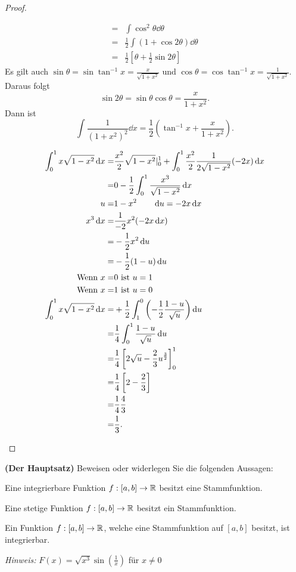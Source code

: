 \begin{proof}
\begin{parts}
\begin{align*}
			=& \int \cos^2\theta\dd{\theta} \\
			=& \frac{1}{2}\int\left( 1+\cos 2\theta \right) \dd{\theta}   \\
			=& \frac{1}{2}\left[ \theta+\frac{1}{2}\sin 2\theta \right] 
		\end{align*}
		Es gilt auch $\sin\theta=\sin\tan^{-1}x=\frac{x}{\sqrt{1+x^2} }$ und $\cos\theta=\cos\tan^{-1}x=\frac{1}{\sqrt{1+x^2} }$. Daraus folgt
		\[
		\sin 2\theta=\sin\theta\cos\theta=\frac{x}{1+x^2}
		.\] 
		Dann ist
		\[
			\int \frac{1}{(1+x^2)^2}\dd{x}=\frac{1}{2}\left( \tan^{-1}x+\frac{x}{1+x^2} \right) 
		.\] 
	\item 
		\begin{align*}
			\int_0^1 x\sqrt{1-x^2} \dd{x}=& \frac{x^2}{2}\sqrt{1-x^2} |_0^1+\int_0^1 \frac{x^2}{2} \frac{1}{2\sqrt{1-x^2} }(-2x)\dd{x}\\
			=&0-\frac{1}{2}\int_0^1 \frac{x^3}{\sqrt{1-x^2} }\dd{x}\\
			u=&1-x^2\qquad \dd{u}=-2x\dd{x}\\
			x^3\dd{x}=&\frac{1}{-2}x^2 (-2x\dd{x})\\
			=&-\frac{1}{2}x^2\dd{u}\\
			=&-\frac{1}{2}(1-u)\dd{u}\\
			\text{Wenn }x=&0\text{ ist }u=1\\
			\text{Wenn }x=&1\text{ ist }u=0\\
			\int_0^1 x\sqrt{1-x^2} \dd{x}=&+\frac{1}{2}\int_1^0\left( -\frac{1}{2}\frac{1-u}{\sqrt{u} } \right) \dd{u}\\
			=&\frac{1}{4}\int_0^1 \frac{1-u}{\sqrt{u} }\dd{u}\\
			=&\frac{1}{4}\left[ 2\sqrt{u} -\frac{2}{3}u^{\frac{3}{2}} \right]_0^1\\
			=&\frac{1}{4}\left[ 2-\frac{2}{3} \right]\\
			=&\frac{1}{4}\frac{4}{3}\\
			=& \frac{1}{3}.\qedhere
		\end{align*}
	\end{parts}
\end{proof}
\begin{Problem}
	\textbf{(Der Hauptsatz)} Beweisen oder widerlegen Sie die folgenden Aussagen:
	\begin{parts}
	\item Eine integrierbare Funktion $f:[a,b]\to \mathbb{R}$ besitzt eine Stammfunktion.
	\item Eine stetige Funktion $f:[a,b]\to \mathbb{R}$ besitzt ein Stammfunktion.
	\item Ein Funktion $f:[a,b]\to \mathbb{R}$, welche eine Stammfunktion auf $[a,b]$ besitzt, ist integrierbar.

	{\footnotesize\emph{Hinweis:} $F(x)=\sqrt{x^3}\sin\left(\frac{1}{x}\right)$ f\"{u}r $x\neq 0$ }
	\end{parts}
\end{Problem}
